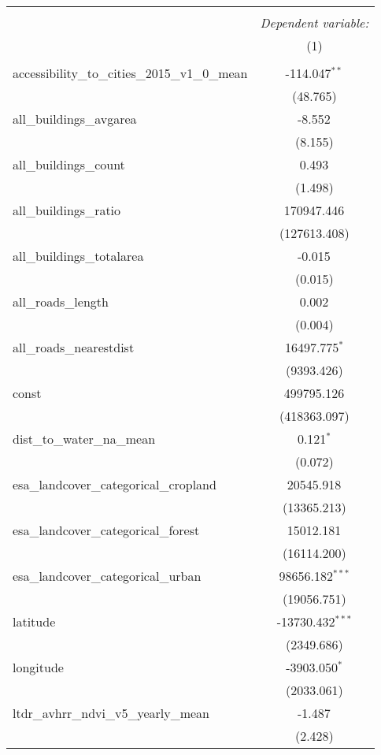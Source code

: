 \begin{table}[!htbp] \centering
\begin{tabular}{@{\extracolsep{5pt}}lc}
\\[-1.8ex]\hline
\hline \\[-1.8ex]
& \multicolumn{1}{c}{\textit{Dependent variable:}} \
\cr \cline{1-2}
\\[-1.8ex] & (1) \\
\hline \\[-1.8ex]
 accessibility_to_cities_2015_v1_0_mean & -114.047$^{**}$ \\
  & (48.765) \\
 all_buildings_avgarea & -8.552$^{}$ \\
  & (8.155) \\
 all_buildings_count & 0.493$^{}$ \\
  & (1.498) \\
 all_buildings_ratio & 170947.446$^{}$ \\
  & (127613.408) \\
 all_buildings_totalarea & -0.015$^{}$ \\
  & (0.015) \\
 all_roads_length & 0.002$^{}$ \\
  & (0.004) \\
 all_roads_nearestdist & 16497.775$^{*}$ \\
  & (9393.426) \\
 const & 499795.126$^{}$ \\
  & (418363.097) \\
 dist_to_water_na_mean & 0.121$^{*}$ \\
  & (0.072) \\
 esa_landcover_categorical_cropland & 20545.918$^{}$ \\
  & (13365.213) \\
 esa_landcover_categorical_forest & 15012.181$^{}$ \\
  & (16114.200) \\
 esa_landcover_categorical_urban & 98656.182$^{***}$ \\
  & (19056.751) \\
 latitude & -13730.432$^{***}$ \\
  & (2349.686) \\
 longitude & -3903.050$^{*}$ \\
  & (2033.061) \\
 ltdr_avhrr_ndvi_v5_yearly_mean & -1.487$^{}$ \\
  & (2.428) \\

\end{tabular}
\end{table}
